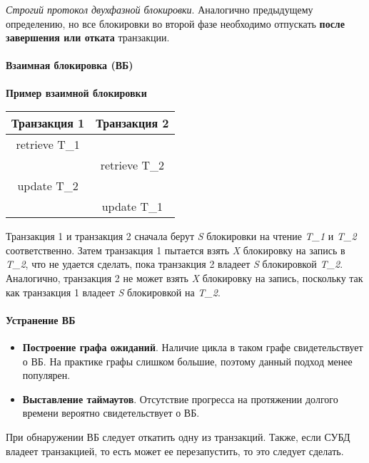 \begin{definition}
	\textit{Строгий протокол двухфазной блокировки}. Аналогично предыдущему определению,
	но все блокировки во второй фазе необходимо отпускать \textbf{после завершения или отката} транзакции.
\end{definition}

\paragraph{Взаимная блокировка (ВБ)}

\textbf{Пример взаимной блокировки}

\begin{center}
	\begin{tabular}{|c c|}
		\hline
		Транзакция 1  & Транзакция 2  \\
		\hline
		retrieve T\_1 &               \\
		              & retrieve T\_2 \\
		update T\_2   &               \\
		              & update T\_1   \\
		\hline
	\end{tabular}
\end{center}

Транзакция 1 и транзакция 2 сначала берут \textit{S} блокировки на чтение
\textit{T\_1} и \textit{T\_2} соответственно. Затем транзакция 1 пытается взять
\textit{X} блокировку на запись в \textit{T\_2}, что не удается сделать, пока
транзакция 2 владеет \textit{S} блокировкой \textit{T\_2}. Аналогично,
транзакция 2 не может взять \textit{X} блокировку на запись, поскольку так как
транзакция 1 владеет \textit{S} блокировкой на \textit{T\_2}.

\paragraph{Устранение ВБ}

\begin{itemize}
	\item \textbf{Построение графа ожиданий}. Наличие цикла в таком графе свидетельствует о ВБ. На
	      практике графы слишком большие, поэтому данный подход менее популярен.
	\item \textbf{Выставление таймаутов}. Отсутствие прогресса на протяжении долгого времени
	      вероятно свидетельствует о ВБ.
\end{itemize}

При обнаружении ВБ следует откатить одну из транзакций. Также, если СУБД владеет транзакцией, то
есть может ее перезапустить, то это следует сделать.

